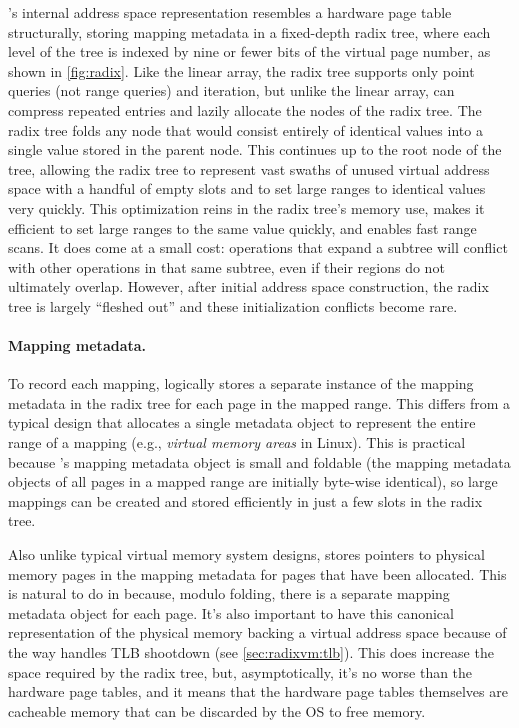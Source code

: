 \vm's internal address space representation resembles a hardware page table
structurally, storing mapping metadata in a fixed-depth radix tree,
where each level of the tree is indexed by nine or fewer bits of the
virtual page number, as shown in \cref{fig:radix}.  Like the linear array,
the radix tree supports only point queries (not range queries) and
iteration, but unlike the linear array, \vm can compress repeated
entries and lazily allocate the nodes of the radix tree.
%
The radix tree folds any node that would consist entirely of identical
values into a single value stored in the parent node.  This continues up to
the root node of the tree, allowing the radix tree to represent vast
swaths of unused virtual address space with a handful of empty slots
and to set large ranges to identical values very quickly.
%
This optimization reins in the radix tree's memory use, makes it
efficient to set large ranges to the same value quickly, and enables
fast range scans.
%
It does come at a small cost: operations that expand a subtree will
conflict with other operations in that same subtree, even if their
regions do not ultimately overlap.  However, after initial address
space construction, the radix tree is largely ``fleshed out'' and
these initialization conflicts become rare.

\paragraph{Mapping metadata.}
To record each mapping, \vm logically stores a separate instance of
the mapping metadata
in the radix tree for each page in the mapped range.  This differs
from a typical design that allocates a single metadata object
to represent the entire range of a mapping (e.g., \emph{virtual memory
areas} in Linux).
%
This is practical because \vm's mapping metadata object is small and
foldable (the mapping metadata objects of all pages in a mapped range
are initially byte-wise identical), so large mappings can be
created and stored efficiently in just a few slots in the radix tree.

Also unlike typical virtual memory system designs, \vm stores pointers
to physical memory pages in the mapping metadata for pages that have
been allocated.  This is natural to do in \vm because, modulo folding,
there is a separate mapping metadata object for each page.  It's also
important to have this canonical representation of the physical memory
backing a virtual address space because of the way \vm handles TLB
shootdown (see \cref{sec:radixvm:tlb}).  This does increase the space
required by the radix tree, but, asymptotically, it's no worse than
the hardware page tables, and it means that the hardware page tables
themselves are cacheable memory that can be discarded by the OS to
free memory.

